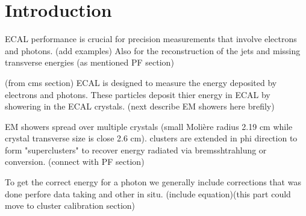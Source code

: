 
\section{Introduction}

ECAL performance is crucial for	precision measurements that involve electrons and photons. (add examples) 
Also for the reconstruction of the jets	and missing transverse energies	(as mentioned PF section)

(from cms section)  ECAL is designed to measure the energy deposited by electrons and photons. 
These particles deposit thier energy in ECAL by showering in the ECAL crystals. (next describe EM showers here brefily) 


EM showers spread over multiple crystals (small Molière radius 2.19 cm while crystal transverse size is close 2.6 cm).
clusters are extended in phi direction to form "superclusters" to recover energy radiated via bremsshtrahlung or conversion. (connect with PF section)


To get the correct energy for a photon we generally include corrections that was done perfore data taking and other in situ.
(include equation)(this part could move to cluster calibration section)  

